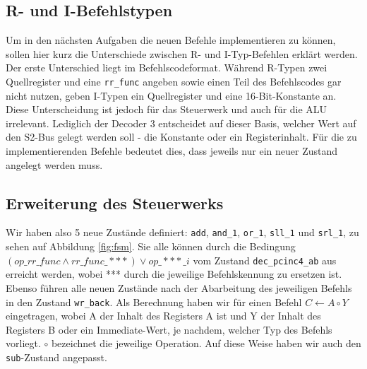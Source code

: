 \documentclass[12pt,a4paper]{scrartcl}
\begin{document}
\subsection*{R- und I-Befehlstypen}
Um in den n\"achsten Aufgaben die neuen Befehle implementieren zu k\"onnen, sollen hier kurz die Unterschiede zwischen R- und I-Typ-Befehlen erkl\"art werden.
Der erste Unterschied liegt im Befehlscodeformat.
W\"ahrend R-Typen zwei Quellregister und eine \texttt{rr\_func} angeben sowie einen Teil des Befehlscodes gar nicht nutzen, geben I-Typen ein Quellregister und eine 16-Bit-Konstante an.
Diese Unterscheidung ist jedoch f\"ur das Steuerwerk und auch f\"ur die ALU irrelevant.
Lediglich der Decoder 3 entscheidet auf dieser Basis, welcher Wert auf den S2-Bus gelegt werden soll - die Konstante oder ein Registerinhalt.
F\"ur die zu implementierenden Befehle bedeutet dies, dass jeweils nur ein neuer Zustand angelegt werden muss.

\subsection*{Erweiterung des Steuerwerks}
Wir haben also 5 neue Zust\"ande definiert: \texttt{add}, \texttt{and\_1}, \texttt{or\_1}, \texttt{sll\_1} und \texttt{srl\_1}, zu sehen auf Abbildung \ref{fig:fsm}.
Sie alle k\"onnen durch die Bedingung $(op\_rr\_func \wedge rr\_func\_***) \vee op\_***\_i$ vom Zustand \texttt{dec\_pcinc4\_ab} aus erreicht werden, wobei *** durch die jeweilige Befehlskennung zu ersetzen ist.
Ebenso f\"uhren alle neuen Zust\"ande nach der Abarbeitung des jeweiligen Befehls in den Zustand \texttt{wr\_back}.
Als Berechnung haben wir f\"ur einen Befehl \texttt{$C \leftarrow A \circ Y$} eingetragen, wobei A der Inhalt des Registers A ist und Y der Inhalt des Registers B oder ein Immediate-Wert, je nachdem, welcher Typ des Befehls vorliegt.
$\circ$ bezeichnet die jeweilige Operation.
Auf diese Weise haben wir auch den \texttt{sub}-Zustand angepasst.
\end{document}
